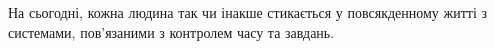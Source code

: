 На сьогодні, кожна людина так чи інакше стикається у повсякденному житті з системами, пов'язаними з контролем часу та завдань.
